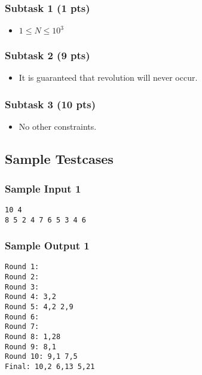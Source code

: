 \subsubsection{Subtask 1 (1 pts)}\label{subtask-1}

\begin{itemize}
\tightlist
\item $1 \le N \le 10^3$
\end{itemize}

\subsubsection{Subtask 2 (9 pts)}\label{subtask-2}

\begin{itemize}
\tightlist
\item It is guaranteed that revolution will never occur. 
\end{itemize}

\subsubsection{Subtask 3 (10 pts)}\label{subtask-3}

\begin{itemize}
\tightlist
\item No other constraints.
\end{itemize}

\newpage

\subsection{Sample Testcases}

\subsubsection{Sample Input 1}\label{sample-input-1}
\begin{verbatim}
10 4
8 5 2 4 7 6 5 3 4 6
\end{verbatim}

\subsubsection{Sample Output 1}\label{sample-output-1}
\begin{verbatim}
Round 1:
Round 2:
Round 3:
Round 4: 3,2
Round 5: 4,2 2,9
Round 6:
Round 7:
Round 8: 1,28
Round 9: 8,1
Round 10: 9,1 7,5
Final: 10,2 6,13 5,21
\end{verbatim}

